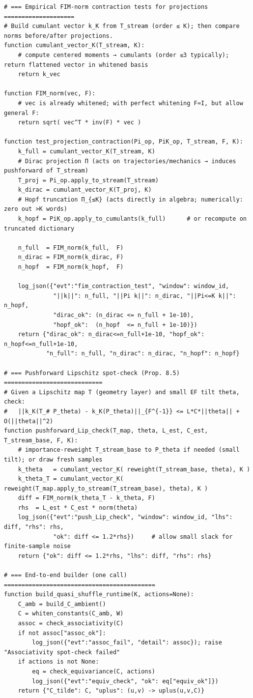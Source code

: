 \documentclass[10pt]{article}
\begin{document}
\begin{lstlisting}
# === Empirical FIM-norm contraction tests for projections ====================
# Build cumulant vector k_K from T_stream (order ≤ K); then compare norms before/after projections.
function cumulant_vector_K(T_stream, K):
    # compute centered moments → cumulants (order ≤3 typically); return flattened vector in whitened basis
    return k_vec

function FIM_norm(vec, F):
    # vec is already whitened; with perfect whitening F≈I, but allow general F:
    return sqrt( vec^T * inv(F) * vec )

function test_projection_contraction(Pi_op, PiK_op, T_stream, F, K):
    k_full = cumulant_vector_K(T_stream, K)
    # Dirac projection Π (acts on trajectories/mechanics → induces pushforward of T_stream)
    T_proj = Pi_op.apply_to_stream(T_stream)
    k_dirac = cumulant_vector_K(T_proj, K)
    # Hopf truncation Π_{≤K} (acts directly in algebra; numerically: zero out >K words)
    k_hopf = PiK_op.apply_to_cumulants(k_full)      # or recompute on truncated dictionary

    n_full  = FIM_norm(k_full,  F)
    n_dirac = FIM_norm(k_dirac, F)
    n_hopf  = FIM_norm(k_hopf,  F)

    log_json({"evt":"fim_contraction_test", "window": window_id,
              "||k||": n_full, "||Pi k||": n_dirac, "||Pi<=K k||": n_hopf,
              "dirac_ok": (n_dirac <= n_full + 1e-10),
              "hopf_ok":  (n_hopf  <= n_full + 1e-10)})
    return {"dirac_ok": n_dirac<=n_full+1e-10, "hopf_ok": n_hopf<=n_full+1e-10,
            "n_full": n_full, "n_dirac": n_dirac, "n_hopf": n_hopf}

# === Pushforward Lipschitz spot-check (Prop. 8.5) ============================
# Given a Lipschitz map T (geometry layer) and small EF tilt theta, check:
#   ||k_K(T_# P_theta) - k_K(P_theta)||_{F^{-1}} <= L*C*||theta|| + O(||theta||^2)
function pushforward_Lip_check(T_map, theta, L_est, C_est, T_stream_base, F, K):
    # importance-reweight T_stream_base to P_theta if needed (small tilt); or draw fresh samples
    k_theta   = cumulant_vector_K( reweight(T_stream_base, theta), K )
    k_theta_T = cumulant_vector_K( reweight(T_map.apply_to_stream(T_stream_base), theta), K )
    diff = FIM_norm(k_theta_T - k_theta, F)
    rhs  = L_est * C_est * norm(theta)
    log_json({"evt":"push_Lip_check", "window": window_id, "lhs": diff, "rhs": rhs,
              "ok": diff <= 1.2*rhs})     # allow small slack for finite-sample noise
    return {"ok": diff <= 1.2*rhs, "lhs": diff, "rhs": rhs}

# === End-to-end builder (one call) ===========================================
function build_quasi_shuffle_runtime(K, actions=None):
    C_amb = build_C_ambient()
    C = whiten_constants(C_amb, W)
    assoc = check_associativity(C)
    if not assoc["assoc_ok"]:
        log_json({"evt":"assoc_fail", "detail": assoc}); raise "Associativity spot-check failed"
    if actions is not None:
        eq = check_equivariance(C, actions)
        log_json({"evt":"equiv_check", "ok": eq["equiv_ok"]})
    return {"C_tilde": C, "uplus": (u,v) -> uplus(u,v,C)}

\end{lstlisting}
\end{document}
